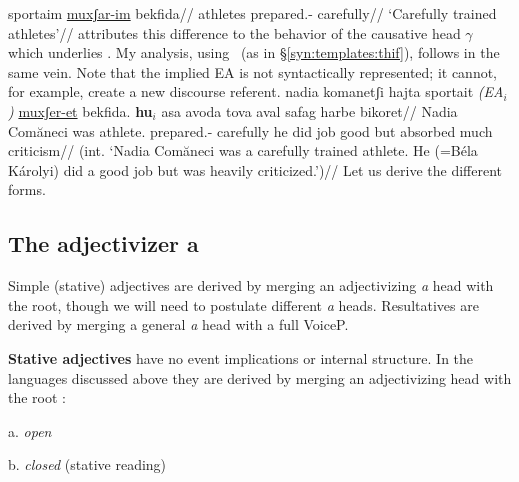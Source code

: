 	\a \begingl
		\gla\rightcomment{(\mhuf)}sportaim \underline{muxʃar-im} bekfida//
		\glb athletes prepared.- carefully//
		\glft `Carefully trained athletes'//
	\endgl
\xe
\cite{doron14adj} attributes this difference to the behavior of the causative head $\gamma$ which underlies \thif. My analysis, using \vd~(as in \S\ref{syn:templates:thif}), follows in the same vein. Note that the implied EA is not syntactically represented; it cannot, for example, create a new discourse referent.
\ex\label{ex:sportait} \ljudge{*}
	\begingl
		\gla nadia komanetʃi hajta sportait \emph{(EA$_i$)} \underline{muxʃer-et} bekfida. \textbf{hu$_i$} asa avoda tova aval safag harbe bikoret//
		\glb Nadia Com\u{a}neci was athlete. {} prepared.- carefully he did job good but absorbed much criticism//
		\glft (int. `Nadia Com\u{a}neci was a carefully trained athlete. He (=B\'ela K\'arolyi) did a good job but was heavily criticized.')//
	\endgl
\xe
Let us derive the different forms.

	\subsection{The adjectivizer a} \label{passn:adjpass:a}

Simple (stative) adjectives are derived by merging an adjectivizing \emph{a} head with the root, though we will need to postulate different \emph{a} heads. Resultatives are derived by merging a general \emph{a} head with a full VoiceP.

\textbf{Stative adjectives} have no event implications or internal structure. In the languages discussed above they are derived by merging an adjectivizing head with the root \citep{embick04li}:
\ex\label{ex:adj-en}
	\begin{minipage}[t]{0.3\textwidth}
		a. \emph{open}\\
	\end{minipage}
	\begin{minipage}[t]{0.3\textwidth}
		b. \emph{closed} (stative reading)\\
	\end{minipage}
\xe


